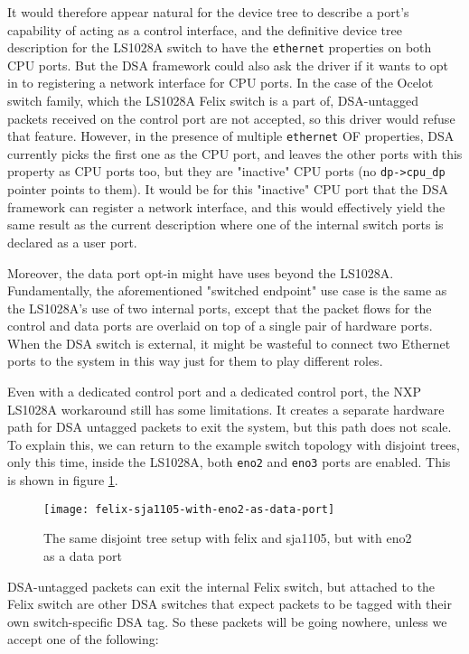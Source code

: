\documentclass[letterpaper]{article}
\begin{document}
It would therefore appear natural for the device tree to describe a port's
capability of acting as a control interface, and the definitive device tree
description for the LS1028A switch to have the \verb|ethernet| properties on
both CPU ports. But the DSA framework could also ask the driver if it wants to
opt in to registering a network interface for CPU ports.
In the case of the Ocelot switch family, which the LS1028A Felix switch is a
part of, DSA-untagged packets received on the control port are not accepted, so
this driver would refuse that feature. However, in the presence of multiple
\verb|ethernet| OF properties, DSA currently picks the first one as the CPU
port, and leaves the other ports with this property as CPU ports too, but they
are "inactive" CPU ports (no \verb|dp->cpu_dp| pointer points to them). It
would be for this "inactive" CPU port that the DSA framework can register a
network interface, and this would effectively yield the same result as the
current description where one of the internal switch ports is declared as a
user port.

Moreover, the data port opt-in might have uses beyond the LS1028A.
Fundamentally, the aforementioned "switched endpoint" use case is the same as
the LS1028A's use of two internal ports, except that the packet flows for the
control and data ports are overlaid on top of a single pair of hardware ports.
When the DSA switch is external, it might be wasteful to connect two Ethernet
ports to the system in this way just for them to play different roles.

Even with a dedicated control port and a dedicated control port, the NXP
LS1028A workaround still has some limitations. It creates a separate hardware
path for DSA untagged packets to exit the system, but this path does not scale.
To explain this, we can return to the example switch topology with disjoint
trees, only this time, inside the LS1028A, both \verb|eno2| and \verb|eno3|
ports are enabled. This is shown in figure \ref{felix-sja1105-with-eno2-as-data-port}.

\begin{figure}[ht]
  \centering
  \texttt{[image: felix-sja1105-with-eno2-as-data-port]}
  \caption{The same disjoint tree setup with felix and sja1105, but with eno2 as a data port}
  \label{felix-sja1105-with-eno2-as-data-port}
\end{figure}

DSA-untagged packets can exit the internal Felix switch, but attached to the
Felix switch are other DSA switches that expect packets to be tagged with their
own switch-specific DSA tag. So these packets will be going nowhere, unless we
accept one of the following:
\end{document}
